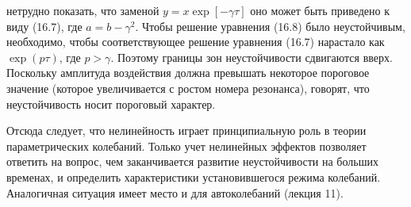 \documentclass[10pt]{article}
\begin{document}
нетрудно показать, что заменой $y=x \exp [-\gamma \tau]$ оно может быть приведено к виду (16.7), где $a=b-\gamma^{2}$. Чтобы решение уравнения (16.8) было неустойчивым, необходимо, чтобы соответствующее решение уравнения (16.7) нарастало как $\exp (p \tau)$, где $p>\gamma$. Поэтому границы зон неустойчивости сдвигаются вверх. Поскольку амплитуда воздействия должна превышать некоторое пороговое значение (которое увеличивается с ростом номера резонанса), говорят, что неустойчивость носит пороговый характер.

Отсюда следует, что нелинейность играет принципиальную роль в теории параметрических колебаний. Только учет нелинейных эффектов позволяет ответить на вопрос, чем заканчивается развитие неустойчивости на больших временах, и определить характеристики установившегося режима колебаний. Аналогичная ситуация имеет место и для автоколебаний (лекция 11).
\end{document}
